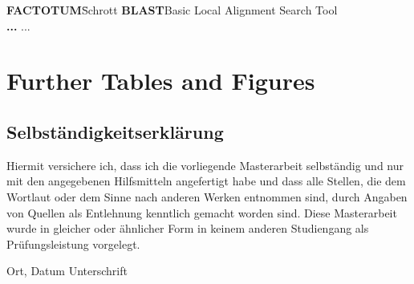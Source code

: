\documentclass[twoside,12pt,a4paper]{report}
\begin{document}
\begin{tabbing}
\textbf{FACTOTUM}\hspace{1cm}\=Schrott\kill
\textbf{BLAST}\>Basic Local Alignment Search Tool \\
\textbf{...} \> ...\\
\end{tabbing}

\cleardoublepage


\setcounter{page}{1}


\cleardoublepage


\cleardoublepage


\cleardoublepage


\cleardoublepage


\cleardoublepage


\appendix
\chapter{Further Tables and Figures} \label{chap:App}

\cleardoublepage


\printbibliography
\cleardoublepage

\thispagestyle{empty}
\section*{Selbständigkeitserklärung}

Hiermit versichere ich, dass ich die vorliegende Masterarbeit selbständig und 
nur mit den angegebenen Hilfsmitteln angefertigt habe und dass alle Stellen, 
die dem Wortlaut oder dem Sinne nach anderen Werken entnommen sind, durch 
Angaben von Quellen als Entlehnung kenntlich gemacht worden sind. 
Diese Masterarbeit wurde in gleicher oder ähnlicher Form in keinem anderen 
Studiengang als Prüfungsleistung vorgelegt. 

\vskip 3cm

Ort, Datum	\hfill Unterschrift \hfill 
\end{document}
